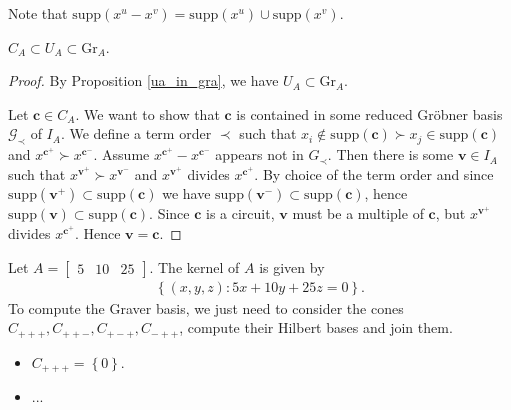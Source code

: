 \documentclass[a4paper, 11pt]{article}
\begin{document}
Note that \( \mathrm{supp}(x^{u} - x^{v}) = \mathrm{supp}(x^{u}) \cup \mathrm{supp}(x^v) \).


\begin{mdframed}  
\begin{thm}
  \(     C_A \subset U_A \subset \mathrm{Gr}_A
  \).
\end{thm}
\end{mdframed}

\begin{proof}
  By Proposition \ref{ua_in_gra}, we have \( U_A \subset \mathrm{Gr}_A \).

  Let \( \mathbf{c} \in C_A \). We want to show that \( \mathbf{c} \) is contained in some reduced Gröbner basis \( \mathcal{G}_\prec \) of \( I_A \). We define a term order \( \prec \) such that \( x_i \notin \mathrm{supp}(\mathbf c)  \succ x_j \in \mathrm{supp}(\mathbf c)\) and \( x^{\mathbf c^+} \succ x^{\mathbf c^-} \). Assume \( x^{\mathbf c^+} - x^{\mathbf c^-} \) appears not in \( G_\prec \). Then there is some \( \mathbf v \in I_A \) such that \( x^{\mathbf v^+} \succ x^{\mathbf v^-} \) and \( x^{\mathbf v^+}  \) divides \( x^{\mathbf c^+} \). By choice of the term order and since \( \mathrm{supp}(\mathbf v^+) \subset \mathrm{supp}(\mathbf c) \) we have \( \mathrm{supp}(\mathbf v^-) \subset \mathrm{supp}(\mathbf c) \), hence \( \mathrm{supp}(\mathbf v) \subset \mathrm{supp}(\mathbf c)\). Since \( \mathbf c \) is a circuit, \( \mathbf v \) must be a multiple of \( \mathbf c \), but \( x^{\mathbf v^+}  \) divides \( x^{\mathbf c^+} \). Hence \( \mathbf v = \mathbf c \).
\end{proof}

\begin{eg}
Let \( A = \begin{bmatrix}
  5 & 10 & 25
\end{bmatrix} \). The kernel of \( A \) is given by 
\begin{align*}
  \left\{ (x,y,z) : 5x + 10y + 25z = 0 \right\}.
\end{align*}
To compute the Graver basis, we just need to consider the cones \( C_{+++}, C_{++-}, C_{+-+}, C_{-++} \), compute their Hilbert bases and join them.
\begin{itemize}
  \item \( C_{+++} = \left\{ 0 \right\} \).
  \item ...
\end{itemize}
\end{eg}
\end{document}

